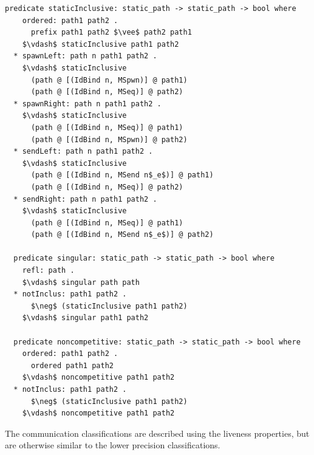 \documentclass[letterpaper, 11pt]{extarticle}
\begin{document}
\begin{lstlisting}[language=logic, mathescape]
  predicate staticInclusive: static_path -> static_path -> bool where
    ordered: path1 path2 .
      prefix path1 path2 $\vee$ path2 path1
    $\vdash$ staticInclusive path1 path2
  * spawnLeft: path n path1 path2 .
    $\vdash$ staticInclusive
      (path @ [(IdBind n, MSpwn)] @ path1)
      (path @ [(IdBind n, MSeq)] @ path2)
  * spawnRight: path n path1 path2 .
    $\vdash$ staticInclusive
      (path @ [(IdBind n, MSeq)] @ path1)
      (path @ [(IdBind n, MSpwn)] @ path2)
  * sendLeft: path n path1 path2 .
    $\vdash$ staticInclusive
      (path @ [(IdBind n, MSend n$_e$)] @ path1)
      (path @ [(IdBind n, MSeq)] @ path2)
  * sendRight: path n path1 path2 .
    $\vdash$ staticInclusive
      (path @ [(IdBind n, MSeq)] @ path1)
      (path @ [(IdBind n, MSend n$_e$)] @ path2)

  predicate singular: static_path -> static_path -> bool where
    refl: path .
    $\vdash$ singular path path
  * notInclus: path1 path2 .
      $\neg$ (staticInclusive path1 path2)
    $\vdash$ singular path1 path2

  predicate noncompetitive: static_path -> static_path -> bool where
    ordered: path1 path2 . 
      ordered path1 path2
    $\vdash$ noncompetitive path1 path2
  * notInclus: path1 path2 .
      $\neg$ (staticInclusive path1 path2)
    $\vdash$ noncompetitive path1 path2
  \end{lstlisting}

The communication classifications are described using the liveness properties, but
are otherwise similar to the lower precision classifications.
\end{document}
